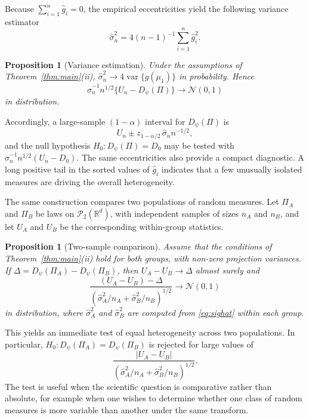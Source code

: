 \documentclass[10pt]{article}
\newtheorem{proposition}[theorem]{Proposition}
\DeclareMathOperator{\varop}{var}
\newcommand{\R}{\mathbb{R}}
\newcommand{\Ptwo}{\mathcal{P}_2(\R^d)}
\begin{document}
Because $\sum_{i=1}^n \widehat g_i=0$, the empirical eccentricities yield the following variance estimator
\begin{equation}
\widehat\sigma_n^2=4(n-1)^{-1}\sum_{i=1}^n \widehat g_i^2.
\label{eq:sighat}
\end{equation}

\begin{proposition}[Variance estimation]\label{prop:variance}
Under the assumptions of Theorem~\ref{thm:main}(ii), $\widehat\sigma_n^2\to 4\varop\{g(\mu_1)\}$ in probability. Hence
\[
\widehat\sigma_n^{-1} n^{1/2}\{U_n-D_{\psi}(\Pi)\}\to \mathcal{N}(0,1)
\]
in distribution.
\end{proposition}

Accordingly, a large-sample $(1-\alpha)$ interval for $D_{\psi}(\Pi)$ is
\[
U_n\pm z_{1-\alpha/2}\,\widehat\sigma_n n^{-1/2},
\]
and the null hypothesis $H_0\colon D_{\psi}(\Pi)=D_0$ may be tested with $\widehat\sigma_n^{-1}n^{1/2}(U_n-D_0)$. The same eccentricities also provide a compact diagnostic. A long positive tail in the sorted values of $\widehat g_i$ indicates that a few unusually isolated measures are driving the overall heterogeneity.

The same construction compares two populations of random measures. Let $\Pi_A$ and $\Pi_B$ be laws on $\Ptwo$, with independent samples of sizes $n_A$ and $n_B$, and let $U_A$ and $U_B$ be the corresponding within-group statistics.

\begin{proposition}[Two-sample comparison]\label{prop:twosample}
Assume that the conditions of Theorem~\ref{thm:main}(ii) hold for both groups, with non-zero projection variances. If $\Delta=D_{\psi}(\Pi_A)-D_{\psi}(\Pi_B)$, then $U_A-U_B\to \Delta$ almost surely and
\[
\frac{(U_A-U_B)-\Delta}{(\widehat\sigma_A^2/n_A+\widehat\sigma_B^2/n_B)^{1/2}}
\to \mathcal{N}(0,1)
\]
in distribution, where $\widehat\sigma_A^2$ and $\widehat\sigma_B^2$ are computed from \eqref{eq:sighat} within each group.
\end{proposition}

This yields an immediate test of equal heterogeneity across two populations. In particular, $H_0\colon D_{\psi}(\Pi_A)=D_{\psi}(\Pi_B)$ is rejected for large values of
\[
\frac{|U_A-U_B|}{(\widehat\sigma_A^2/n_A+\widehat\sigma_B^2/n_B)^{1/2}}.
\]
The test is useful when the scientific question is comparative rather than absolute, for example when one wishes to determine whether one class of random measures is more variable than another under the same transform.
\end{document}
